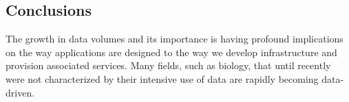 






\subsection{Conclusions}
\label{sec:conclusion}

The growth in data volumes and its importance is having profound implications on
the way applications are designed to the way we develop infrastructure and
provision associated services.  Many fields, such as biology, that until
recently were not characterized by their intensive use of data are rapidly
becoming data-driven.

